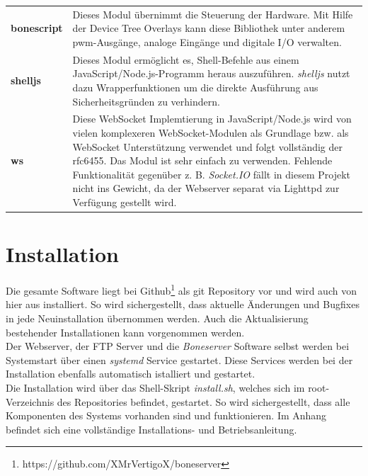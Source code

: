 \begin{longtabu} to \textwidth {
X[1]
X[5]}
\textbf{bonescript} & Dieses Modul übernimmt die Steuerung der Hardware. Mit Hilfe der Device Tree Overlays kann diese Bibliothek unter anderem \gls{pwm}-Ausgänge, analoge Eingänge und digitale I/O verwalten.\\
\textbf{shelljs} & Dieses Modul ermöglicht es, Shell-Befehle aus einem JavaScript/Node.js-Programm heraus auszuführen. \textit{shelljs} nutzt dazu Wrapperfunktionen um die direkte Ausführung aus Sicherheitsgründen zu verhindern.\\
\textbf{ws} & Diese WebSocket Implemtierung in JavaScript/Node.js wird von vielen komplexeren WebSocket-Modulen als Grundlage bzw. als WebSocket Unterstützung verwendet und folgt vollständig der rfc6455. Das Modul ist sehr einfach zu verwenden. Fehlende Funktionalität gegenüber z. B. \emph{Socket.IO} fällt in diesem Projekt nicht ins Gewicht, da der Webserver separat via Lighttpd zur Verfügung gestellt wird.
\end{longtabu}


\section{Installation}
Die gesamte Software liegt bei Github\footnote{https://github.com/XMrVertigoX/boneserver} als git Repository vor und wird auch von hier aus installiert. So wird sichergestellt, dass aktuelle Änderungen und Bugfixes in jede Neuinstallation übernommen werden. Auch die Aktualisierung bestehender Installationen kann vorgenommen werden.\\ 
Der Webserver, der FTP Server und die \textit{Boneserver} Software selbst werden bei Systemstart über einen \textit{systemd} Service gestartet. Diese Services werden bei der Installation ebenfalls automatisch istalliert und gestartet.\\

Die Installation wird über das Shell-Skript \textit{install.sh}, welches sich im root-Verzeichnis des Repositories befindet, gestartet. So wird sichergestellt, dass alle Komponenten des Systems vorhanden sind und funktionieren. Im Anhang befindet sich eine vollständige Installations- und Betriebsanleitung.